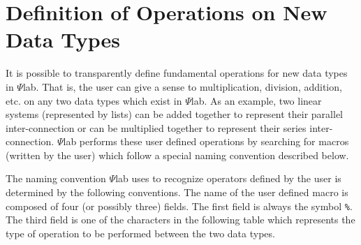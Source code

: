 \section{Definition of Operations on New Data Types}
\label{s4.3}

	It is possible to transparently define fundamental operations 
for new data types in $\Psi$lab.
That is, the user can give a sense to multiplication, division, addition, etc.
on any two data types which exist in $\Psi$lab.  As an example, two linear
systems (represented by lists)
can be added together to represent their parallel inter-connection
or can be multiplied together to represent their series inter-connection.
$\Psi$lab performs these user defined operations by searching for macros
(written by the user) which follow a special naming convention described
below.

	The naming convention $\Psi$lab uses to recognize operators 
defined by the user is determined by the following conventions.  The name
of the user defined macro is composed of four (or possibly three)
fields.  The first field is always the symbol {\tt \%}.  
The third field is one of the characters in the following table
which represents the type of operation to be performed between the
two data types.

